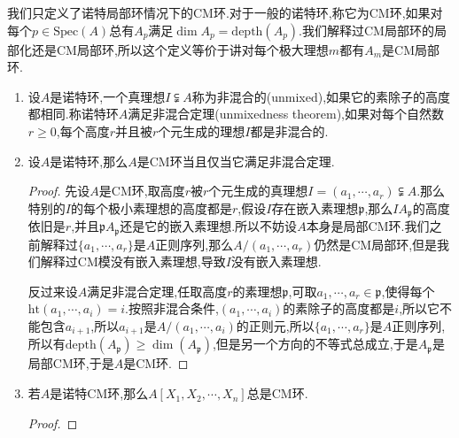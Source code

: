 我们只定义了诺特局部环情况下的CM环.对于一般的诺特环,称它为CM环,如果对每个$p\in\mathrm{Spec}(A)$总有$A_p$满足$\dim A_p=\mathrm{depth}(A_p)$.我们解释过CM局部环的局部化还是CM局部环,所以这个定义等价于讲对每个极大理想$m$都有$A_m$是CM局部环.
\begin{enumerate}
	\item 设$A$是诺特环,一个真理想$I\subsetneqq A$称为非混合的(unmixed),如果它的素除子的高度都相同.称诺特环$A$满足非混合定理(unmixedness theorem),如果对每个自然数$r\ge0$,每个高度$r$并且被$r$个元生成的理想$I$都是非混合的.
	\item 设$A$是诺特环,那么$A$是CM环当且仅当它满足非混合定理.
	\begin{proof}
		
		先设$A$是CM环,取高度$r$被$r$个元生成的真理想$I=(a_1,\cdots,a_r)\subsetneqq A$.那么特别的$I$的每个极小素理想的高度都是$r$,假设$I$存在嵌入素理想$\mathfrak{p}$,那么$IA_{\mathfrak{p}}$的高度依旧是$r$,并且$\mathfrak{p}A_{\mathfrak{p}}$还是它的嵌入素理想.所以不妨设$A$本身是局部CM环.我们之前解释过$\{a_1,\cdots,a_r\}$是$A$正则序列,那么$A/(a_1,\cdots,a_r)$仍然是CM局部环,但是我们解释过CM模没有嵌入素理想,导致$I$没有嵌入素理想.
		
		\qquad
		
		反过来设$A$满足非混合定理,任取高度$r$的素理想$\mathfrak{p}$,可取$a_1,\cdots,a_r\in\mathfrak{p}$,使得每个$\mathrm{ht}(a_1,\cdots,a_i)=i$.按照非混合条件,$(a_1,\cdots,a_i)$的素除子的高度都是$i$,所以它不能包含$a_{i+1}$,所以$a_{i+1}$是$A/(a_1,\cdots,a_i)$的正则元,所以$\{a_1,\cdots,a_r\}$是$A$正则序列,所以有$\mathrm{depth}(A_{\mathfrak{p}})\ge\dim(A_{\mathfrak{p}})$,但是另一个方向的不等式总成立,于是$A_{\mathfrak{p}}$是局部CM环,于是$A$是CM环.
	\end{proof}	
	\item 若$A$是诺特CM环,那么$A[X_1,X_2,\cdots,X_n]$总是CM环.
	\begin{proof}
		

\end{proof}
\end{enumerate}
